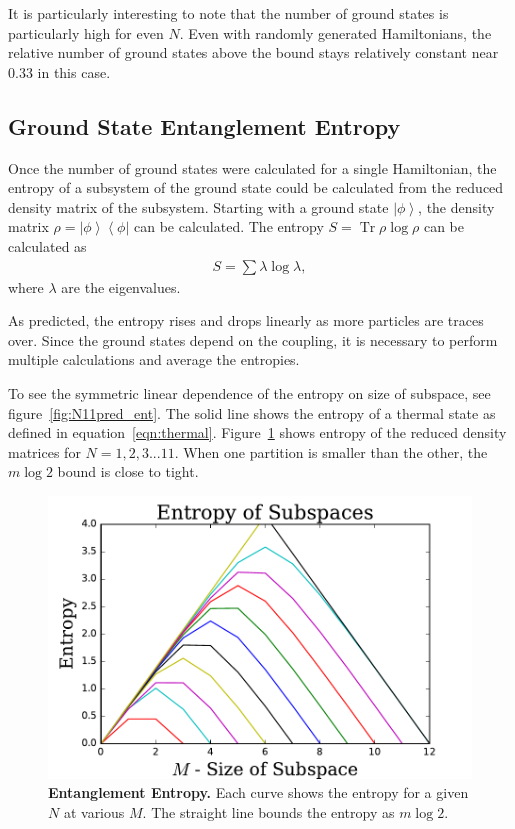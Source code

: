 \documentclass[12pt]{article} %
\newcommand{\ket}[1]{\left|#1\right\rangle}
\newcommand{\bra}[1]{\left\langle#1\right|}
\DeclareMathOperator{\Tr}{Tr}
\begin{document}
It is particularly interesting to note that the number of ground states is particularly high for even $N$. Even with randomly generated Hamiltonians, the relative number of ground states above the bound stays relatively constant near 0.33 in this case.

\subsection{Ground State Entanglement Entropy}\emph{} \label{sub:num_ent}

Once the number of ground states were calculated for a single Hamiltonian, the entropy of a subsystem of the ground state could be calculated from the reduced density matrix of the subsystem. Starting with a ground state $\ket{\phi}$, the density matrix $\rho = \ket{\phi}\bra{\phi}$ can be calculated. The entropy $S = \Tr\rho\log\rho$ can be calculated as 
\begin{align}
S = \sum \lambda\log\lambda,
\end{align}
where $\lambda$ are the eigenvalues. 

As predicted, the entropy rises and drops linearly as more particles are traces over. Since the ground states depend on the coupling, it is necessary to perform multiple calculations and average the entropies. 

To see the symmetric linear dependence of the entropy on size of subspace, see figure~\ref{fig:N11pred_ent}. The solid line shows the entropy of a thermal state as defined in equation~\ref{eqn:thermal}. Figure~\ref{fig:allentropy} shows entropy of the reduced density matrices for $N = 1,2,3...11$. When one partition is smaller than the other, the $m\log2$ bound is close to tight. 

\begin{figure}
	\centering
	\includegraphics[width=.5\textwidth]{allentropy}
	\caption{\textbf{Entanglement Entropy.} Each curve shows the entropy for a given $N$ at various $M$. The straight line bounds the entropy as $m\log2$.}
	\label{fig:allentropy}
\end{figure}
\end{document}
